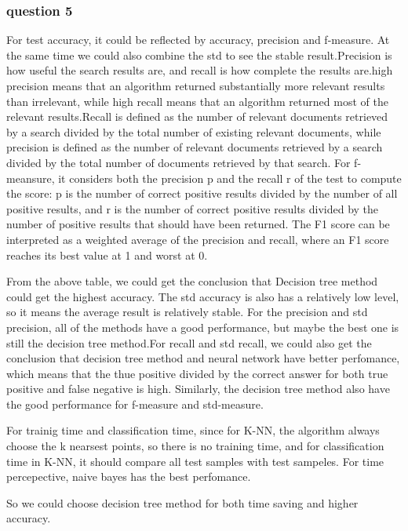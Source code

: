\documentclass[]{article}
\begin{document}
\subsubsection{question 5}
For test accuracy, it could be reflected by accuracy, precision and f-measure. At the same time we could also combine the std to see the stable result.Precision is how useful the search results are, and recall is how complete the results are.high precision means that an algorithm returned substantially more relevant results than irrelevant, while high recall means that an algorithm returned most of the relevant results.Recall is defined as the number of relevant documents retrieved by a search divided by the total number of existing relevant documents, while precision is defined as the number of relevant documents retrieved by a search divided by the total number of documents retrieved by that search. For f-meansure, it considers both the precision p and the recall r of the test to compute the score: p is the number of correct positive results divided by the number of all positive results, and r is the number of correct positive results divided by the number of positive results that should have been returned. The F1 score can be interpreted as a weighted average of the precision and recall, where an F1 score reaches its best value at 1 and worst at 0.


From the above table, we could get the conclusion that Decision tree method could get the highest accuracy. The std accuracy is also has a relatively low level, so it means the average result is relatively stable. For the precision and std precision, all of the methods have a good performance, but maybe the best one is still the decision tree method.For recall and std recall, we could also get the conclusion that decision tree method and neural network have better perfomance, which means that the thue positive divided by the correct answer for both true positive and false negative is high. Similarly, the decision tree method also have the good performance for f-measure and std-measure.

For trainig time and classification time, since for K-NN, the algorithm always choose the k nearsest points, so there is no training time, and for classification time in K-NN, it should compare all test samples with test sampeles. For time percepective, naive bayes has the best perfomance. 

So we could choose decision tree method for both time saving and higher accuracy. 

\end{document}
